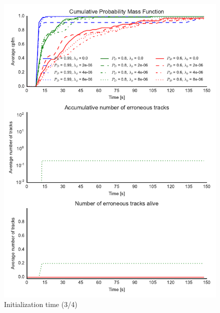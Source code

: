 \begin{figure}
\centering
\includegraphics{Figures/plots/Scenario0_Init-Time(3-4).pdf}
\caption{Initialization time (3/4)}\label{fig:init_time_3-4}
\end{figure}

